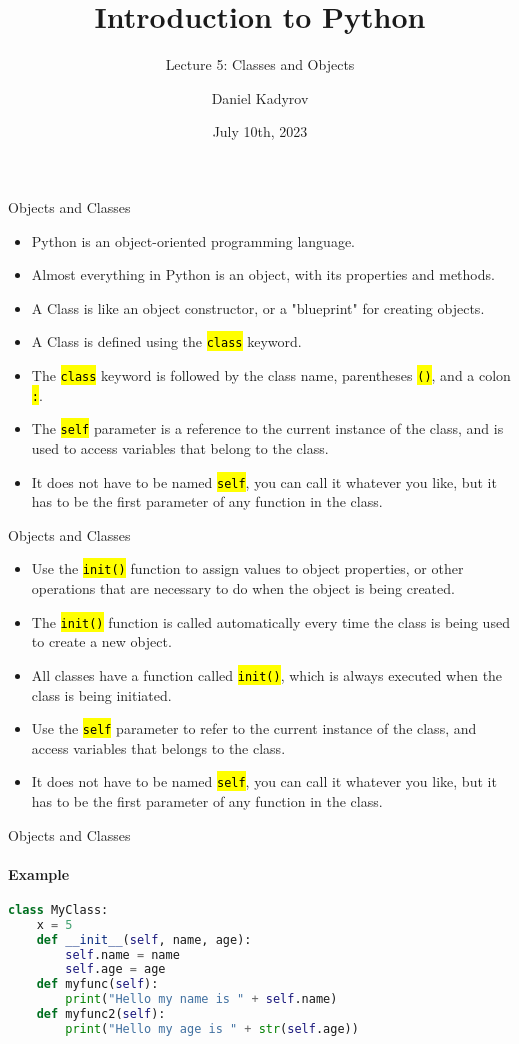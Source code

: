 \documentclass[
    aspectratio=169, 
    usepdftitle=false, 
    xcolor={dvipsnames},
    hyperref={
        colorlinks,
        linkcolor=black,
        urlcolor=blue}
    ]{beamer}
\title[Introduction to Python]{Introduction to Python}
\subtitle{Lecture 5: Classes and Objects}
\author{Daniel Kadyrov}
\date{July 10th, 2023}
\let\OldTexttt\texttt
\renewcommand{\texttt}[1]{\OldTexttt{\hl{#1}}}%
\begin{document}
\begin{frame}
    \titlepage
\end{frame}

\begin{frame}[fragile]{Objects and Classes}
    \begin{itemize}
        \item Python is an object-oriented programming language.
        \item Almost everything in Python is an object, with its properties and methods.
        \item A Class is like an object constructor, or a "blueprint" for creating objects.
        \item A Class is defined using the \texttt{class} keyword.
        \item The \texttt{class} keyword is followed by the class name, parentheses \texttt{()}, and a colon \texttt{:}.
        \item The \texttt{self} parameter is a reference to the current instance of the class, and is used to access variables that belong to the class.
        \item It does not have to be named \texttt{self}, you can call it whatever you like, but it has to be the first parameter of any function in the class.
    \end{itemize}
\end{frame}

\begin{frame}[fragile]{Objects and Classes}
    \begin{itemize}
        \item Use the \texttt{init()} function to assign values to object properties, or other operations that are necessary to do when the object is being created.
        \item The \texttt{init()} function is called automatically every time the class is being used to create a new object.
        \item All classes have a function called \texttt{init()}, which is always executed when the class is being initiated.
        \item Use the \texttt{self} parameter to refer to the current instance of the class, and access variables that belongs to the class.
        \item It does not have to be named \texttt{self}, you can call it whatever you like, but it has to be the first parameter of any function in the class.
    \end{itemize}
\end{frame}

\begin{frame}[fragile]{Objects and Classes}
    \framesubtitle{Example}
    \begin{lstlisting}[language=Python]
class MyClass:
    x = 5
    def __init__(self, name, age):
        self.name = name
        self.age = age
    def myfunc(self):
        print("Hello my name is " + self.name)
    def myfunc2(self):
        print("Hello my age is " + str(self.age))
    \end{lstlisting}
\end{frame}
\end{document}
